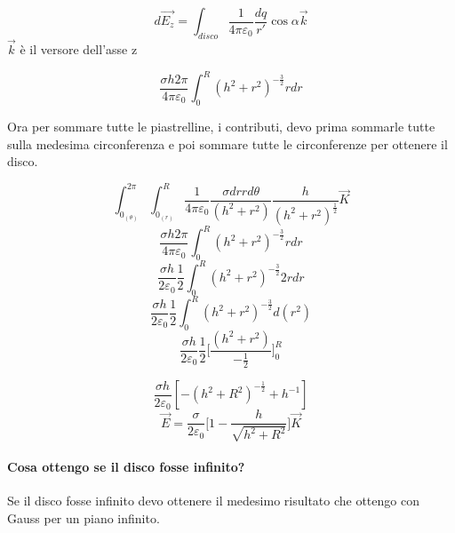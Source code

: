 \begin{equation*}
    d\vec{E_z} = \int_{disco} \frac{1}{4\pi \varepsilon_0}\frac{dq}{r'}\cos\alpha \vec{k}
\end{equation*}
$\vec{k}$ è il versore dell'asse z

\begin{equation*}
   \frac{\sigma h 2\pi}{4 \pi \varepsilon_0}\int_0 ^R (h^2+r^2)^{-\frac{3}{2}} rdr
\end{equation*}

Ora per sommare tutte le piastrelline, i contributi, devo prima sommarle tutte sulla medesima circonferenza e poi sommare tutte le circonferenze per ottenere il disco.

\begin{equation*}
   \int_{0_{(\theta)}} ^ {2\pi} \int_{0_{(r)}} ^ {R} \frac{1}{4\pi \varepsilon_0}\frac{\sigma dr rd\theta}{(h^2 + r^2)}\frac{h}{(h^2 + r^2)^\frac{1}{2}} \vec{K}
\end{equation*}
\begin{equation*}
   \frac{\sigma h 2\pi}{4 \pi \varepsilon_0}\int_0 ^R (h^2+r^2)^{-\frac{3}{2}} rdr
\end{equation*}
\begin{equation*}
   \frac{\sigma h}{2\varepsilon_0} \frac{1}{2}\int_0 ^R (h^2+r^2)^{-\frac{3}{2}} 2rdr
\end{equation*}
\begin{equation*}
   \frac{\sigma h}{2\varepsilon_0} \frac{1}{2}\int_0 ^R (h^2+r^2)^{-\frac{3}{2}} d(r^2)
\end{equation*}
\begin{equation*}
   \frac{\sigma h}{2\varepsilon_0} \frac{1}{2} \biggl[ \frac{(h^2+r^2)}{-\frac{1}{2}} \biggl]_0 ^R
\end{equation*}

\begin{equation*}
   \frac{\sigma h}{2\varepsilon_0} [ -(h^2+ R^2)^{-{\frac{1}{2}}} + h^{-1}]
\end{equation*}
\begin{equation}
   \vec{E} = \frac{\sigma}{2\varepsilon_0} \bigg[ 1 - \frac{h}{\sqrt{h^2 + R^2}}\bigg]\vec{K}
\end{equation}

\paragraph{Cosa ottengo se il disco fosse infinito?}
Se il disco fosse infinito devo ottenere il medesimo risultato che ottengo con Gauss per un piano infinito.

